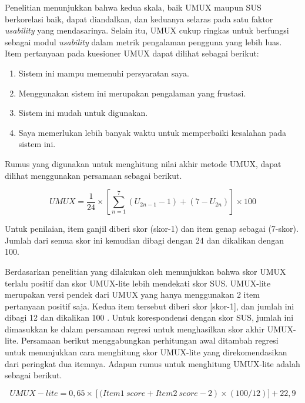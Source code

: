 \par Penelitian \citep{finstad2010usability} menunjukkan bahwa kedua skala, baik UMUX maupun SUS berkorelasi baik, dapat diandalkan, dan keduanya selaras pada satu faktor \textit{usability} yang mendasarinya. Selain itu, UMUX cukup ringkas untuk berfungsi sebagai modul \textit{usability} dalam metrik pengalaman pengguna yang lebih luas. Item pertanyaan pada kuesioner UMUX dapat dilihat sebagai berikut:

\begin{enumerate}
	\item Sistem ini mampu memenuhi persyaratan saya.
	\item Menggunakan sistem ini merupakan pengalaman yang frustasi.
	\item Sistem ini mudah untuk digunakan.
	\item Saya memerlukan lebih banyak waktu untuk memperbaiki kesalahan pada sistem ini.
\end{enumerate}

Rumus yang digunakan untuk menghitung nilai akhir metode UMUX, dapat dilihat menggunakan persamaan sebagai berikut.

\begin{equation}
	UMUX = \frac{1}{24} \times \left [ \sum_{n=1}^{7}\left ( U_{2n-1}-1 \right ) + \left ( 7-U_{2n} \right )\right ]\times 100
\end{equation}

Untuk penilaian, item ganjil diberi skor (skor-1) dan item genap sebagai (7-skor). Jumlah dari semua skor ini kemudian dibagi dengan 24 dan dikalikan dengan 100.

Berdasarkan penelitian yang dilakukan oleh \citep{article} menunjukkan bahwa skor UMUX terlalu positif dan skor UMUX-lite lebih mendekati skor SUS. UMUX-lite merupakan versi pendek dari UMUX yang hanya menggunakan 2 item pertanyaan positif saja. Kedua item tersebut diberi skor [skor-1], dan jumlah ini dibagi 12 dan dikalikan 100 \citep{lewis2013umux}. Untuk korespondensi dengan skor SUS, jumlah ini dimasukkan ke dalam persamaan regresi untuk menghasilkan skor akhir UMUX-lite. Persamaan berikut menggabungkan perhitungan awal ditambah regresi untuk menunjukkan cara menghitung skor UMUX-lite yang direkomendasikan dari peringkat dua itemnya. Adapun rumus untuk menghitung UMUX-lite adalah sebagai berikut.

\begin{equation}
	UMUX-lite = 0,65 \times \left [ ( Item 1 \ score +  Item 2 \ score - 2 \right ) \times (100/12) ] + 22,9
\end{equation}

